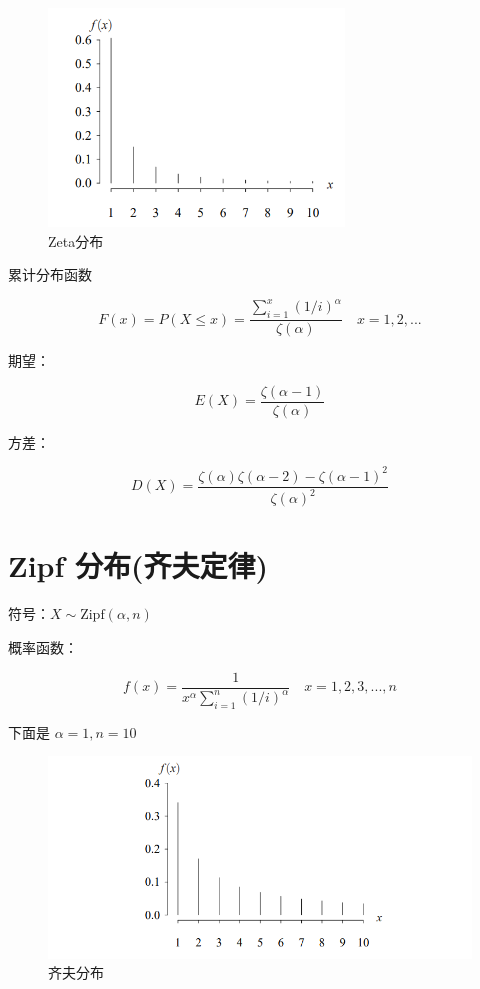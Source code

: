 \documentclass[12pt, a4paper, oneside]{ctexbook}
\begin{document}
\begin{figure}[H]
  \centering
  \includegraphics[width=0.7\textwidth]{image/Zeta分布.png}
  \caption{Zeta分布}
  \label{fig:example}
\end{figure}

 累计分布函数

$$
F(x) = P(X \leq x) = \dfrac{\sum\limits_{i = 1}^{x} (1/i)^{\alpha}}{\zeta(\alpha)} \quad x = 1, 2, ...
$$

 期望：

$$
E(X) = \dfrac{\zeta(\alpha - 1)}{\zeta(\alpha)}
$$

 方差：

$$
D(X) = \dfrac{\zeta(\alpha)\zeta(\alpha - 2) - \zeta(\alpha - 1)^{2}}{\zeta(\alpha)^{2}}
$$

\section{Zipf 分布(齐夫定律)}

 符号：$X \sim \text{Zipf}(\alpha, n)$

 概率函数：

$$
f(x) = \dfrac{1}{x^{\alpha}\sum\limits_{i = 1}^{n}(1 / i)^{\alpha}} \quad  x = 1, 2, 3, ..., n
$$

下面是 $\alpha = 1, n = 10$

\begin{figure}[H]
  \centering
  \includegraphics[width=1\textwidth]{image/齐夫分布.png}
  \caption{齐夫分布}
  \label{fig:example}
\end{figure}
\end{document}

